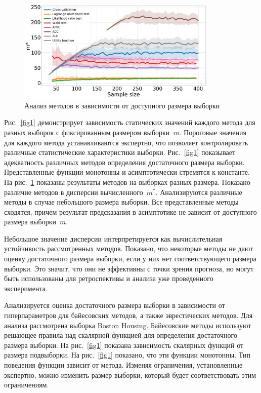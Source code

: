 \begin{figure}[h!t]\center
    \includegraphics[width=0.85\textwidth]{results/samplesize/graphs.png}
    \caption{Анализ методов в зависимости от доступного размера выборки}
    \label{fig2}
\end{figure}

Рис.~\ref{fig1} демонстрирует зависимость статических значений каждого метода для разных выборок с фиксированным размером выборки~$m$. Пороговые значения для каждого метода устанавливаются экспертно, что позволяет контролировать различные статистические характеристики выборки. Рис.~\ref{fig1} показывает адекватность различных методов определения достаточного размера выборки. Представленные функции монотонны и асимптотически стремятся к константе.
На рис.~\ref{fig2} показаны результаты методов на выборках разных размера. Показано различие методов в дисперсии вычисленного~$m^*$. Анализируются различные методы в случае небольшого размера выборки. Все представленные методы сходятся, причем результат предсказания в асимптотике не зависит от доступного размера выборки~$m$.   

Небольшое значение дисперсии интерпретируется как вычислительная устойчивость рассмотренных методов. Показано, что некоторые методы не дают оценку достаточного размера выборки, если у них нет соответствующего размера выборки. Это значит, что они не эффективны с точки зрения прогноза, но могут быть использованы для ретроспективы и анализа уже проведенного эксперимента.

Анализируется оценка достаточного размера выборки в зависимости от гиперпараметров для байесовских методов, а также эврестических методов. Для анализа рассмотрена выборка {Boston Housing}.
Байесовские методы используют решающее правила над скалярной функцией для определения достаточного размера выборки. На рис.~\ref{fig1} показана зависимость скалярных функций от размера подвыборки. На рис.~\ref{fig1} показано, что эти функции монотонны. Тип поведения функции зависит от метода. Изменяя ограничения, установленные экспертно, можно изменить размер выборки, который будет соответствовать этим ограничениям.

